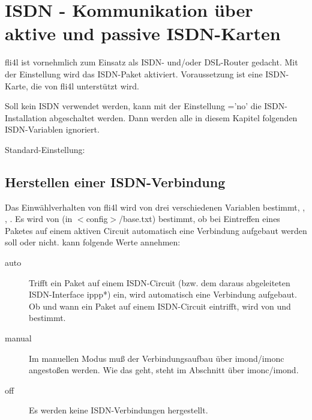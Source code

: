 \section {ISDN - Kommunikation über aktive und passive ISDN-Karten}

fli4l ist vornehmlich zum Einsatz als ISDN- und/oder DSL-Router
gedacht.  Mit der Einstellung  wird das ISDN-Paket
aktiviert.  Voraussetzung ist eine ISDN-Karte, die von fli4l
unterstützt wird.
    
Soll kein ISDN verwendet werden, kann mit der Einstellung
='no' die ISDN-Installation abgeschaltet werden. Dann werden
alle in diesem Kapitel folgenden ISDN-Variablen ignoriert.
    
Standard-Einstellung: 


\subsection {Herstellen einer ISDN-Verbindung}
\begin{sloppypar}
Das Einwählverhalten von fli4l wird von drei verschiedenen Variablen
bestimmt, \mbox{,} ,
. Es wird von
 (in $<$config$>$/base.txt) bestimmt, ob bei Eintreffen eines Paketes auf
einem aktiven Circuit automatisch eine Verbindung aufgebaut werden
soll oder nicht.  kann folgende Werte annehmen:
\end{sloppypar}

\begin{description}
\item[auto] Trifft ein Paket auf einem ISDN-Circuit (bzw. dem daraus
  abgeleiteten ISDN-Interface ippp*) ein, wird automatisch eine Verbindung
  aufgebaut. Ob und wann ein Paket auf einem ISDN-Circuit eintrifft, wird von
   und 
  bestimmt.
       
\item[manual] Im manuellen Modus muß der Verbindungsaufbau über
  imond/imonc angestoßen werden. Wie das geht, steht im Abschnitt über
  imonc/imond.

 \item[off] Es werden keine ISDN-Verbindungen hergestellt.
\end{description}


